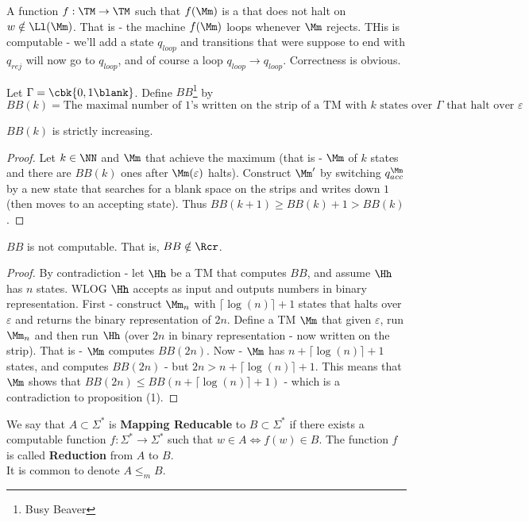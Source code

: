 \begin{example}
	A function $f:\TM \to \TM$ such that $f(\Mm)$ is a \TM that does not halt on $w\notin \Ll(\Mm)$. That is - the machine $f(\Mm)$ loops whenever $\Mm$ rejects. THis is computable - we'll add a state $q_{loop}$ and transitions that were suppose to end with $q_{rej}$ will now go to $q_{loop}$, and of course a loop $q_{loop}\to q_{loop}$. Correctness is obvious.
\end{example}
\begin{example}
	 Let $\Gamma = \cbk{0,1\blank}$. Define $BB$\footnote{Busy Beaver} by
	\[
	BB(k) = \text{The maximal number of $1$'s written on the strip of a TM with $k$ states over $\Gamma$ that halt over $\varepsilon$}
	\]
	\begin{prop}[1]
		$BB(k)$ is strictly increasing.
	\end{prop}
\begin{proof}
	Let $k\in \NN$ and $\Mm$ that achieve the maximum (that is - $\Mm$ of $k$ states and there are $BB(k)$ ones after $\Mm(\varepsilon)$ halts). Construct $\Mm'$ by switching $q^\Mm_{acc}$ by a new state that searches for a blank space on the strips and writes down $1$ (then moves to an accepting state). Thus $BB(k+1)\geq BB(k) + 1 > BB(k)$.
\end{proof}
\begin{prop}[2]
	$BB$ is not computable. That is, $BB\notin \Rcr$.
\end{prop}
\begin{proof}
	By contradiction - let $\Hh$ be a TM that computes $BB$, and assume $\Hh$ has $n$ states. WLOG $\Hh$ accepts as input and outputs numbers in binary representation. First - construct $\Mm_n$ with $\lceil\log(n)\rceil +1 $ states that halts over $\varepsilon$ and returns the binary representation of $2n$. Define a TM $\Mm$ that given $\varepsilon$, run $\Mm_n$ and then run $\Hh$ (over $2n$ in binary representation - now written on the strip). That is - $\Mm$ computes $BB(2n)$. Now - $\Mm$ has $n + \lceil\log(n)\rceil + 1$ states, and computes $BB(2n)$ - but $2n > n + \lceil\log(n)\rceil + 1$. This means that $\Mm$ shows that $BB(2n)\leq BB(n + \lceil\log(n)\rceil + 1)$ - which is a contradiction to proposition (1).\end{proof}
\end{example}
\begin{yellowBox}
	\begin{defn}
		We say that $A\subset \Sigma^*$ is \textbf{Mapping Reducable} to $B\subset\Sigma^*$ if there exists a computable function $f:\Sigma^* \to \Sigma^*$ such that $w\in A\iff f(w)\in B$. The function $f$ is called \textbf{Reduction} from $A$ to $B$. \\
		It is common to denote $A\leq_{m}B$.
	\end{defn}
\end{yellowBox}
